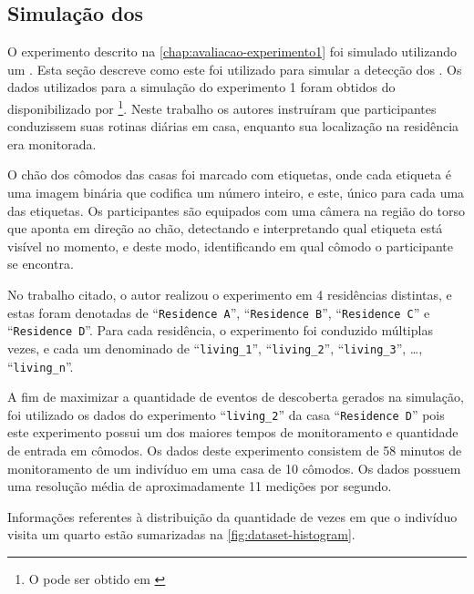 \subsection{Simulação dos \beacons}\label{chap:avaliacao-simulacao-beacons}

O experimento descrito na \autoref{chap:avaliacao-experimento1} foi simulado utilizando um \dataset. Esta seção descreve como este \dataset foi utilizado para simular a detecção dos \beacons. Os dados utilizados para a simulação do experimento 1 foram obtidos do \dataset disponibilizado por \footnote{O \dataset pode ser obtido em \cite{byrne:kozlowski:dataset:2019}}. Neste trabalho os autores instruíram que participantes conduzissem suas rotinas diárias em casa, enquanto sua localização na residência era monitorada.

O chão dos cômodos das casas foi marcado com etiquetas, onde cada etiqueta é uma imagem binária que codifica um número inteiro, e este, único para cada uma das etiquetas. Os participantes são equipados com uma câmera na região do torso que aponta em direção ao chão, detectando e interpretando qual etiqueta está visível no momento, e deste modo, identificando em qual cômodo o participante se encontra.

No trabalho citado, o autor realizou o experimento em 4 residências distintas, e estas foram denotadas de ``\texttt{Residence A}'', ``\texttt{Residence B}'', ``\texttt{Residence C}'' e ``\texttt{Residence D}''. Para cada residência, o experimento foi conduzido múltiplas vezes, e cada um denominado de ``\texttt{living\_1}'', ``\texttt{living\_2}'', ``\texttt{living\_3}'', \dots{}, ``\texttt{living\_n}''.


A fim de maximizar a quantidade de eventos de descoberta gerados na simulação, foi utilizado os dados do experimento ``\texttt{living\_2}'' da casa ``\texttt{Residence D}'' pois este experimento possui um dos maiores tempos de monitoramento e quantidade de entrada em cômodos. Os dados deste experimento consistem de 58 minutos de monitoramento de um indivíduo em uma casa de 10 cômodos. Os dados possuem uma resolução média de aproximadamente 11 medições por segundo.

Informações referentes à distribuição da quantidade de vezes em que o indivíduo visita um quarto estão sumarizadas na \autoref{fig:dataset-histogram}.

